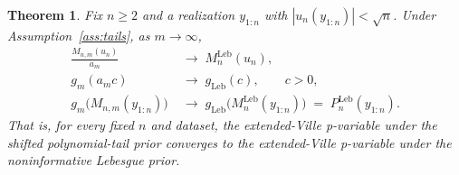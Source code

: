 \documentclass{article}%
\newtheorem{theorem}{Theorem}[section]
\newcommand{\Leb}{\mathrm{Leb}}
\begin{document}
\begin{theorem}\label{thm:recovery}
Fix \(n\geq 2\) and a realization \(y_{1:n}\) with
\(|u_n(y_{1:n})|<\sqrt n\). Under
Assumption~\ref{ass:tails}, as \(m\to\infty\),
\begin{align}
  \frac{M_{n,m}(u_n)}{a_m}
   &\;\longrightarrow\; M_n^{\Leb}(u_n),
   \label{eq:Mnm-asymp}\\
  g_m(a_m c)
   &\;\longrightarrow\; g_{\Leb}(c),\qquad c>0,
   \label{eq:gm-asymp}\\
  g_m\!\bigl(M_{n,m}(y_{1:n})\bigr)
   &\;\longrightarrow\;
   g_{\Leb}\!\bigl(M_n^{\Leb}(y_{1:n})\bigr)
   \;=\;P_n^{\Leb}(y_{1:n}).
   \label{eq:p-asymp}
\end{align}
That is, for every fixed \(n\) and dataset, the extended-Ville
p-variable under the shifted polynomial-tail prior converges to the
extended-Ville p-variable under the noninformative Lebesgue prior.
\end{theorem}
\end{document}
